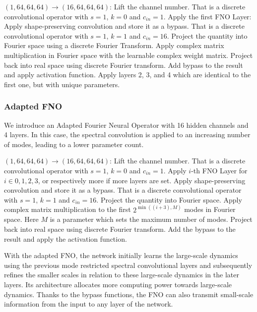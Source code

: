 \documentclass{article}
\begin{document}
\begin{outline}[enumerate]
    \1 $(1, 64, 64, 64) \rightarrow (16, 64, 64, 64)$: Lift the channel number. That is a discrete convolutional operator with $s=1$, $k=0$ and $c_{in}=1$.
    \1 Apply the first FNO Layer:
        \2 Apply shape-preserving convolution and store it as a bypass. That is a discrete convolutional operator with $s=1$, $k=1$ and $c_{in} = 16$.
        \2 Project the quantity into Fourier space using a discrete Fourier Transform.
        \2 Apply complex matrix multiplication in Fourier space with the learnable complex weight matrix.
        \2 Project back into real space using discrete Fourier transform.
        \2 Add bypass to the result and apply activation function.
    \1 Apply layers 2, 3, and 4 which are identical to the first one, but with unique parameters.
\end{outline}


\subsubsection{Adapted FNO}

We introduce an Adapted Fourier Neural Operator with 16 hidden channels and 4 layers. In this case, the spectral convolution is applied to an increasing number of modes, leading to a lower parameter count.

\begin{outline}[enumerate]
    \1 $(1, 64, 64, 64) \rightarrow (16, 64, 64, 64)$: Lift the channel number. That is a discrete convolutional operator with $s=1$, $k=0$ and $c_{in}=1$.
    \1 Apply $i$-th FNO Layer for $i \in {0, 1, 2, 3}$, or respectively more if more layers are set.
        \2 Apply shape-preserving convolution and store it as a bypass. That is a discrete convolutional operator with $s=1$, $k=1$ and $c_{in} = 16$.
        \2 Project the quantity into Fourier space.
        \2 Apply complex matrix multiplication to the first $2^{\min((i + 3), M)}$ modes in Fourier space. Here $M$ is a parameter which sets the maximum number of modes.
        \2 Project back into real space using discrete Fourier transform.
        \2 Add the bypass to the result and apply the activation function.
    
\end{outline}

With the adapted FNO, the network initially learns the large-scale dynamics using the previous mode restricted spectral convolutional layers and subsequently refines the smaller scales in relation to these large-scale dynamics in the later layers. Its architecture allocates more computing power towards large-scale dynamics. Thanks to the bypass functions, the FNO can also transmit small-scale information from the input to any layer of the network.
\end{document}
